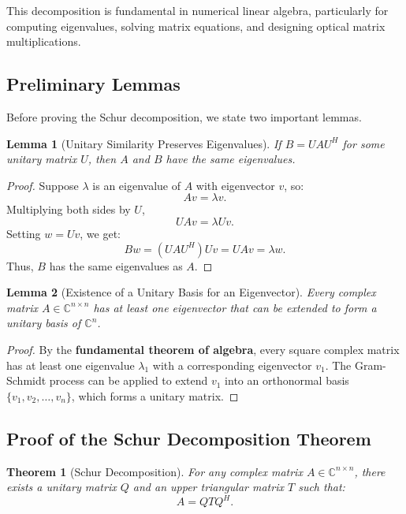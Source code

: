 \documentclass[a4paper,12pt]{article}
\newtheorem{theorem}{Theorem}
\newtheorem{lemma}{Lemma}
\begin{document}
This decomposition is fundamental in numerical linear algebra, particularly for computing eigenvalues, solving matrix equations, and designing optical matrix multiplications.

\subsection{\textbf{Preliminary Lemmas}}

Before proving the Schur decomposition, we state two important lemmas.

\begin{lemma}[Unitary Similarity Preserves Eigenvalues]
    If \( B = U A U^H \) for some unitary matrix \( U \), then \( A \) and \( B \) have the same eigenvalues.
\end{lemma}

\begin{proof}
    Suppose \( \lambda \) is an eigenvalue of \( A \) with eigenvector \( v \), so:
    \[
    A v = \lambda v.
    \]
    Multiplying both sides by \( U \),
    \[
    U A v = \lambda U v.
    \]
    Setting \( w = U v \), we get:
    \[
    B w = (U A U^H) U v = U A v = \lambda w.
    \]
    Thus, \( B \) has the same eigenvalues as \( A \).
\end{proof}

\begin{lemma}[Existence of a Unitary Basis for an Eigenvector]
    Every complex matrix \( A \in \mathbb{C}^{n \times n} \) has at least one eigenvector that can be extended to form a unitary basis of \( \mathbb{C}^n \).
\end{lemma}

\begin{proof}
    By the \textbf{fundamental theorem of algebra}, every square complex matrix has at least one eigenvalue \( \lambda_1 \) with a corresponding eigenvector \( v_1 \). The Gram-Schmidt process can be applied to extend \( v_1 \) into an orthonormal basis \( \{ v_1, v_2, \dots, v_n \} \), which forms a unitary matrix.
\end{proof}

\subsection{\textbf{Proof of the Schur Decomposition Theorem}}

\begin{theorem}[Schur Decomposition]
    For any complex matrix \( A \in \mathbb{C}^{n \times n} \), there exists a unitary matrix \( Q \) and an upper triangular matrix \( T \) such that:
    \[
    A = Q T Q^H.
    \]
\end{theorem}
\end{document}
